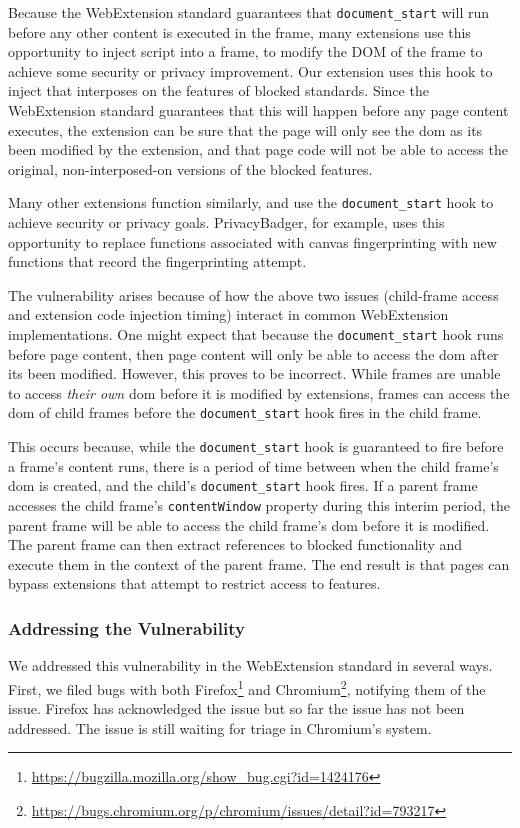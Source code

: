 Because the WebExtension standard guarantees that \texttt{document\_start} will
run before any other content is executed in the frame, many extensions use
this opportunity to inject script into a frame, to modify the DOM of the frame
to achieve some security or privacy improvement.  Our extension uses this
hook to inject \JS that interposes on the features of blocked standards.
Since the WebExtension standard guarantees that this will happen
before any page content executes, the extension can be sure that the page will
only see the \gls{dom} as its been modified by the extension, and that page code
will not be able to access the original, non-interposed-on versions of the
blocked features.

Many other extensions function similarly, and use the
\texttt{document\_start} hook to achieve security or privacy goals.
PrivacyBadger, for example, uses this opportunity to replace \WAPI functions
associated with canvas fingerprinting with new functions that record the
fingerprinting attempt.


The vulnerability arises because of how the above two issues (child-frame
access and extension code injection timing) interact in common WebExtension
implementations.  One might expect that because the \texttt{document\_start}
hook runs before page content, then page content will only be able to access
the \gls{dom} after its been modified.  However, this proves to be incorrect.
While frames are unable to access \emph{their own} \gls{dom} before it is
modified by extensions, frames can access the \gls{dom} of child frames before
the \texttt{document\_start} hook fires in the child frame.

This occurs because, while the \texttt{document\_start} hook is guaranteed to
fire before a frame's content runs, there is a period of time between when the
child frame's \gls{dom} is created, and the child's \texttt{document\_start}
hook fires.  If a parent frame accesses the child frame's
\texttt{contentWindow} property during this interim period, the parent frame
will be able to access the child frame's \gls{dom} before it is modified.  The
parent frame can then extract references to blocked functionality and execute
them in the context of the parent frame.  The end result is that pages can
bypass extensions that attempt to restrict access to \WAPI features.


\subsubsection{Addressing the Vulnerability}
We addressed this vulnerability in the WebExtension standard in several ways.
First, we filed bugs with both
Firefox\footnote{\url{https://bugzilla.mozilla.org/show_bug.cgi?id=1424176}}
and
Chromium\footnote{\url{https://bugs.chromium.org/p/chromium/issues/detail?id=793217}},
notifying them of the issue.  Firefox has acknowledged the issue but so far the
issue has not been addressed.  The issue is still waiting for triage in
Chromium's system.

